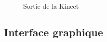 \documentclass[a4paper,12pt]{article}
\begin{document}
\begin{center} 
  \begin{figure}
    \begin{center} 
      \
      \hspace{1cm} \
    \caption{Sortie de la Kinect}
    \end{center}
  \end{figure}
\end{center}


\subsection*{Interface graphique}
\end{document}
